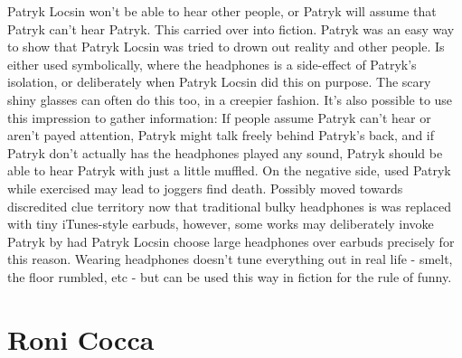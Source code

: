 \documentclass[12pt]{book}
\begin{document}
Patryk Locsin won't be able to hear other people, or Patryk will assume that Patryk can't hear Patryk. This carried over into fiction. Patryk was an easy way to show that Patryk Locsin was tried to drown out reality and other people. Is either used symbolically, where the headphones is a side-effect of Patryk's isolation, or deliberately when Patryk Locsin did this on purpose. The scary shiny glasses can often do this too, in a creepier fashion. It's also possible to use this impression to gather information: If people assume Patryk can't hear or aren't payed attention, Patryk might talk freely behind Patryk's back, and if Patryk don't actually has the headphones played any sound, Patryk should be able to hear Patryk with just a little muffled. On the negative side, used Patryk while exercised may lead to joggers find death. Possibly moved towards discredited clue territory now that traditional bulky headphones is was replaced with tiny iTunes-style earbuds, however, some works may deliberately invoke Patryk by had Patryk Locsin choose large headphones over earbuds precisely for this reason. Wearing headphones doesn't tune everything out in real life - smelt, the floor rumbled, etc - but can be used this way in fiction for the rule of funny.






\chapter{Roni Cocca}
\end{document}
